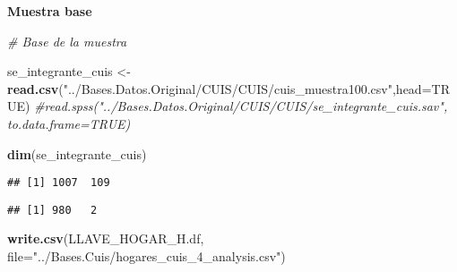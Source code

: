 \documentclass[11pt,]{article}
\newenvironment{Shaded}{\begin{snugshade}}{\end{snugshade}}
\newcommand{\KeywordTok}[1]{\textcolor[rgb]{0.13,0.29,0.53}{\textbf{#1}}}
\newcommand{\DataTypeTok}[1]{\textcolor[rgb]{0.13,0.29,0.53}{#1}}
\newcommand{\DecValTok}[1]{\textcolor[rgb]{0.00,0.00,0.81}{#1}}
\newcommand{\StringTok}[1]{\textcolor[rgb]{0.31,0.60,0.02}{#1}}
\newcommand{\CommentTok}[1]{\textcolor[rgb]{0.56,0.35,0.01}{\textit{#1}}}
\newcommand{\OtherTok}[1]{\textcolor[rgb]{0.56,0.35,0.01}{#1}}
\newcommand{\OperatorTok}[1]{\textcolor[rgb]{0.81,0.36,0.00}{\textbf{#1}}}
\newcommand{\NormalTok}[1]{#1}
\begin{document}
\textbf{Muestra base}

\begin{Shaded}
\begin{Highlighting}[]
\CommentTok{# Base de la muestra}

\NormalTok{se_integrante_cuis <-}\StringTok{ }\KeywordTok{read.csv}\NormalTok{(}\StringTok{"../Bases.Datos.Original/CUIS/CUIS/cuis_muestra100.csv"}\NormalTok{,}\DataTypeTok{head=}\OtherTok{TRUE}\NormalTok{)}
                      \CommentTok{#read.spss("../Bases.Datos.Original/CUIS/CUIS/se_integrante_cuis.sav", to.data.frame=TRUE)}

\KeywordTok{dim}\NormalTok{(se_integrante_cuis)}
\end{Highlighting}
\end{Shaded}

\begin{verbatim}
## [1] 1007  109
\end{verbatim}

\begin{Shaded}
\end{Shaded}

\begin{verbatim}
## [1] 980   2
\end{verbatim}

\begin{Shaded}
\begin{Highlighting}[]
\KeywordTok{write.csv}\NormalTok{(LLAVE_HOGAR_H.df, }\DataTypeTok{file=}\StringTok{"../Bases.Cuis/hogares_cuis_4_analysis.csv"}\NormalTok{)}
\end{Highlighting}
\end{Shaded}
\end{document}
